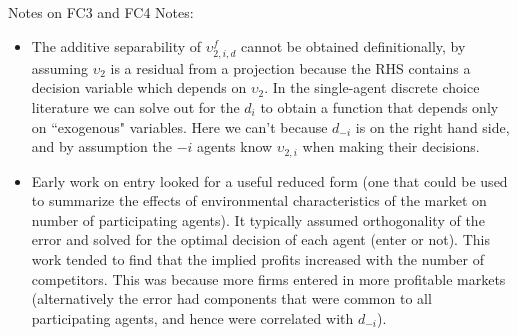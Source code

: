 \begin{frame}{Notes on FC3 and FC4}
Notes:

\small
\begin{itemize}

\item The additive separability of $\upsilon _{2,i,d}^{f}$ cannot be
obtained definitionally, by assuming $\upsilon _{2}$ is a residual from a
projection because the RHS contains a
decision variable which depends on $\upsilon _{2}$. In the single-agent discrete choice literature we can solve out for the $d_{i}$ to obtain a function that depends only on ``exogenous" variables.
Here we can't because $d_{-i}$ is on the right hand side,
and by assumption the $-i$ agents know $\upsilon _{2,i}$ when making their
decisions.
\item Early work on entry looked for a useful reduced form (one that could be used to summarize the effects of environmental characteristics of the market on number of participating agents). It typically assumed orthogonality of the error and solved for the optimal decision of each agent (enter or not). This work tended to find that the implied profits increased with the number of competitors. This was because more firms entered in more profitable markets (alternatively the error had components that were common to all participating agents, and hence were correlated with $d_{-i}$).
\end{itemize}

\end{frame}

